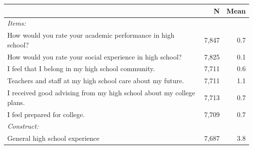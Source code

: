 \begin{tabular}{@{}p{4in}rr@{}}
\toprule
                                                                          & N      & Mean \\
\midrule
\textit{Items:}                                                           &        &      \\
\quad How would you rate your academic performance in high school?        & 7{,}847 & 0.7  \\
\quad How would you rate your social experience in high school?           & 7{,}825 & 0.1  \\
\quad I feel that I belong in my high school community.                   & 7{,}711 & 0.6  \\
\quad Teachers and staff at my high school care about my future.          & 7{,}711 & 1.1  \\
\quad I received good advising from my high school about my college plans. & 7{,}713 & 0.7  \\
\quad I feel prepared for college.                                        & 7{,}709 & 0.7  \\
\midrule
\textit{Construct:}                                                       &        &      \\
\quad General high school experience                                      & 7{,}687 & 3.8  \\
\bottomrule
\end{tabular}

